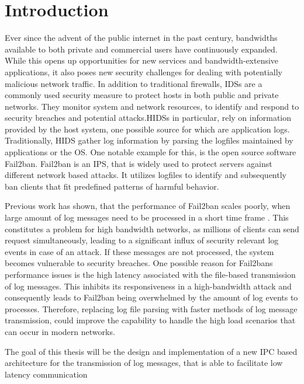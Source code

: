 %
%

\chapter{Introduction}
\label{sec:intro}

Ever since the advent of the public internet in the past century, bandwidths available to both
private and commercial users have continuously expanded. While this opens up opportunities for new services and bandwidth-extensive 
applications, it also poses new security challenges for dealing with potentially malicious network traffic. In addition to traditional firewalls, 
\acp{IDS} are a commonly used security measure to protect hosts in both public and private networks. They
monitor system and network resources, to identify and respond to security breaches and potential attacks.\acp{HIDS} in particular, rely
on information provided by the host system, one possible source for which are application logs. Traditionally, \ac{HIDS} gather log information by 
parsing the logfiles maintained by applications or the \ac{OS}. One notable example for this, is the open source software Fail2ban. Fail2ban is
an \ac{IPS}, that is widely used to protect servers against different network based attacks. It
utilizes logfiles to identify and subsequently ban clients that fit predefined patterns of harmful behavior. 
\par
Previous work has shown, that the performance of Fail2ban scales poorly, when large amount of log messages need to be processed in a short time frame \cite{mikolajczak2022}. This constitutes
a problem for high bandwidth networks, as millions of clients can send request simultaneously, leading to a significant influx of security relevant log events in case of an attack.  
If these messages are not processed, the system becomes vulnerable to security breaches. One possible reason for Fail2bans performance issues is the high latency associated with
the file-based transmission of log messages. This inhibits its responsiveness in a high-bandwidth attack and consequently leads to Fail2ban being overwhelmed by the amount of log events to processes. 
Therefore, replacing log file parsing with faster methods of log message transmission, could improve the capability to handle the high load scenarios that can occur in modern networks. 
\par
The goal of this thesis will be the design and implementation of a new \ac{IPC} based architecture for the
transmission of log messages, that is able to facilitate low latency communication
